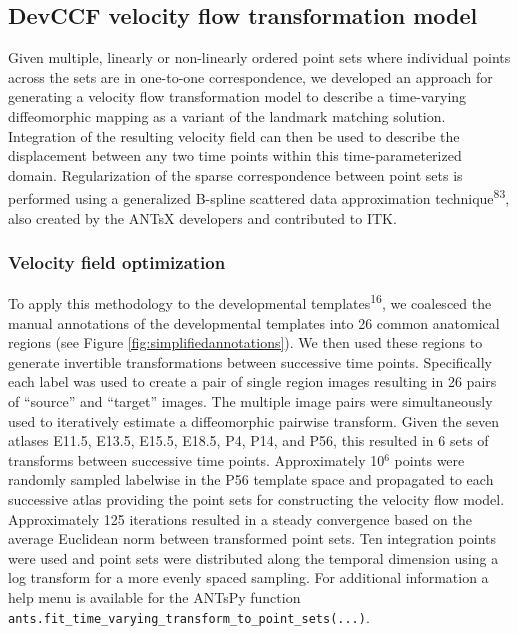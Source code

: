 \documentclass[
  12pt,
]{article}
\begin{document}
\subsection{DevCCF velocity flow transformation
model}\label{devccf-velocity-flow-transformation-model}

Given multiple, linearly or non-linearly ordered point sets where
individual points across the sets are in one-to-one correspondence, we
developed an approach for generating a velocity flow transformation
model to describe a time-varying diffeomorphic mapping as a variant of
the landmark matching solution. Integration of the resulting velocity
field can then be used to describe the displacement between any two time
points within this time-parameterized domain. Regularization of the
sparse correspondence between point sets is performed using a
generalized B-spline scattered data approximation
technique\textsuperscript{83}, also created by the ANTsX developers and
contributed to ITK.

\subsubsection{Velocity field
optimization}\label{velocity-field-optimization}

To apply this methodology to the developmental
templates\textsuperscript{16}, we coalesced the manual annotations of
the developmental templates into 26 common anatomical regions (see
Figure \ref{fig:simplifiedannotations}). We then used these regions to
generate invertible transformations between successive time points.
Specifically each label was used to create a pair of single region
images resulting in 26 pairs of ``source'' and ``target'' images. The
multiple image pairs were simultaneously used to iteratively estimate a
diffeomorphic pairwise transform. Given the seven atlases E11.5, E13.5,
E15.5, E18.5, P4, P14, and P56, this resulted in 6 sets of transforms
between successive time points. Approximately 10\(^6\) points were
randomly sampled labelwise in the P56 template space and propagated to
each successive atlas providing the point sets for constructing the
velocity flow model. Approximately 125 iterations resulted in a steady
convergence based on the average Euclidean norm between transformed
point sets. Ten integration points were used and point sets were
distributed along the temporal dimension using a log transform for a
more evenly spaced sampling. For additional information a help menu is
available for the ANTsPy function
\texttt{ants.fit\_time\_varying\_transform\_to\_point\_sets(...)}.
\end{document}

